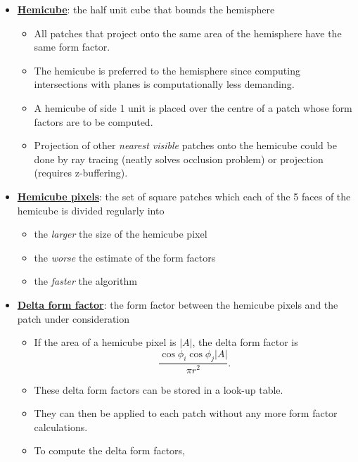 \documentclass[twocolumn,landscape,10pt]{article}
\theoremstyle{definition}
\begin{document}
\begin{itemize}
    \item \underline{\textbf{Hemicube}}: the half unit cube that bounds the
        hemisphere
        \begin{itemize}
            \item All patches that project onto the same area of the hemisphere have the
                same form factor.
            \item The hemicube is preferred to the hemisphere since computing
                intersections with planes is computationally less demanding.
            \item A hemicube of side 1 unit is placed over the centre of a patch whose
                form factors are to be computed.
            \item Projection of other \emph{nearest visible} patches onto the hemicube 
                could be done by ray tracing (neatly solves occlusion problem)
                or projection (requires z-buffering).
        \end{itemize} 
    \item \underline{\textbf{Hemicube pixels}}: the set of square patches which
        each of the 5 faces of the hemicube is divided regularly into
        \begin{itemize}
            \item the \emph{larger} the size of the hemicube pixel
            \item the \emph{worse} the estimate of the form factors
            \item the \emph{faster} the algorithm
        \end{itemize} 
    \item \underline{\textbf{Delta form factor}}: the form factor between the
        hemicube pixels and the patch under consideration
        \begin{itemize}
            \item If the area of a hemicube pixel is $|A|$, the delta form
                factor is
                \[
                    \frac{\cos{\phi_i}\cos{\phi_j}|A|}{\pi r^2}.
                \]
            \item These delta form factors can be stored in a look-up table.
            \item They can then be applied to each patch without any more form
                factor calculations.
            \item To compute the delta form factors,
                \[
\]
\end{itemize}
\end{itemize}
\end{document}
